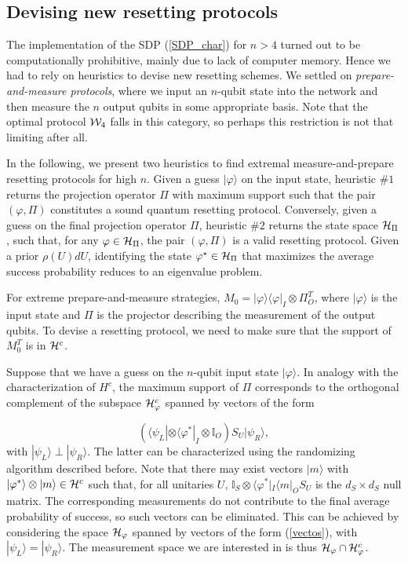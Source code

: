 \documentclass[twocolumn,prx,aps,longbibliography]{revtex4-1}
\def\be{\begin{equation}}
\def\ee{\end{equation}}
\def\H{{\cal H}}
\def\id{{\mathbb I}}
\def\H{{\cal H}}
\def\bra#1{\langle#1|} \def\ket#1{|#1\rangle}
\def\proj#1{\ket{#1}\!\bra{#1}}
\def\id{{\mathbb I}}
\begin{document}
\begin{appendix}
\section{Devising new resetting protocols}
\label{heuristics}
The implementation of the SDP (\ref{SDP_char}) for $n>4$ turned out to be computationally prohibitive, mainly due to lack of computer memory. Hence we had to rely on heuristics to devise new resetting schemes. We settled on \emph{prepare-and-measure protocols}, where we input an $n$-qubit state into the network and then measure the $n$ output qubits in some appropriate basis. Note that the optimal protocol ${\cal W}_4$ falls in this category, so perhaps this restriction is not that limiting after all.

In the following, we present two heuristics to find extremal measure-and-prepare resetting protocols for high $n$. Given a guess $\ket{\varphi}$ on the input state, heuristic $\# 1$ returns the projection operator $\Pi$ with maximum support such that the pair $(\varphi,\Pi)$ constitutes a sound quantum resetting protocol. Conversely, given a guess on the final projection operator $\Pi$, heuristic $\#2$ returns the state space $\H_{\Pi}$, such that, for any $\varphi\in \H_{\Pi}$, the pair $(\varphi,\Pi)$ is a valid resetting protocol. Given a prior $\rho(U)dU$, identifying the state $\varphi^\star\in \H_{\Pi}$ that maximizes the average success probability reduces to an eigenvalue problem. 


For extreme prepare-and-measure strategies, $M_0=\proj{\varphi}_I\otimes \Pi^T_O$, where $\ket{\varphi}$ is the input state and $\Pi$ is the projector describing the measurement of the output qubits. To devise a resetting protocol, we need to make sure that the support of $M^T_0$ is in $\H^c$. 

Suppose that we have a guess on the $n$-qubit input state $\ket{\varphi}$. In analogy with the characterization of $H^c$, the maximum support of $\Pi$ corresponds to the orthogonal complement of the subspace $\H^c_{\varphi}$ spanned by vectors of the form

\be
(\bra{\psi_L}\otimes\bra{\varphi^*}_I\otimes\id_O)S_U\ket{\psi_R}, 
\label{vectos}
\ee
\noindent with $\ket{\psi_L}\perp\ket{\psi_R}$. The latter can be characterized using the randomizing algorithm described before. Note that there may exist vectors $\ket{m}$ with $\ket{\varphi^*}\otimes\ket{m}\in \H^c$ such that, for all unitaries $U$, $\id_S\otimes\bra{\varphi^*}_I\bra{m}_OS_U$ is the $d_S\times d_S$ null matrix. The corresponding measurements do not contribute to the final average probability of success, so such vectors can be eliminated. This can be achieved by considering the space $\H_{\varphi}$ spanned by vectors of the form (\ref{vectos}), with $\ket{\psi_L}=\ket{\psi_R}$. The measurement space we are interested in is thus $\H_\varphi\cap \H^c_{\varphi}$.


\end{appendix}
\end{document}
